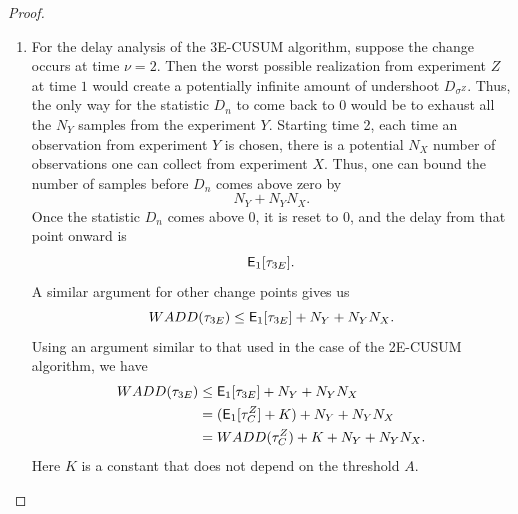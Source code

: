 \documentclass[10pt,a4paper]{amsart}
\begin{document}
\begin{proof}
\begin{enumerate}
\item For the delay analysis of the 3E-CUSUM algorithm, suppose the change occurs at time $\nu = 2$. Then the worst possible realization from experiment $Z$ at time $1$ would create a potentially infinite amount of undershoot $D_{\sigma^Z}$. Thus, the only way for the statistic $D_n$ to come back to $0$ would be to exhaust all the $N_Y$ samples from the experiment $Y$. Starting time 2, each time an observation from experiment $Y$ is chosen, there is a potential $N_X$ number of observations one can collect from experiment $X$. Thus, one can bound the number of samples before $D_n$ comes above zero by 
$$ N_Y + N_Y N_X. $$
Once the statistic $D_n$ comes above $0$, it is reset to $0$, and the delay from that point onward is 
$$ \mathsf{E}_1 [\tau_{\textup{\fontsize{6 pt}{10 pt}\selectfont 3E}}]. $$
A similar argument for other change points gives us 
$$ \textup{WADD} (\tau_{\textup{\fontsize{6 pt}{10 pt}\selectfont 3E}}) \leq \mathsf{E}_1 [\tau_{\textup{\fontsize{6 pt}{10 pt}\selectfont 3E}}] + N_Y + N_Y N_X. $$
Using an argument similar to that used in the case of the 2E-CUSUM algorithm, we have
\begin{align*}
\textup{WADD} (\tau_{\textup{\fontsize{6 pt}{10 pt}\selectfont 3E}})
& \leq \mathsf{E}_1 [\tau_{\textup{\fontsize{6 pt}{10 pt}\selectfont 3E}}] + N_Y + N_Y N_X \\
& = (\mathsf{E}_1 [\tau_{\textup{\fontsize{6 pt}{10 pt}\selectfont C}}^Z] + K) + N_Y + N_Y N_X \\
& = \textup{WADD} (\tau_{\textup{\fontsize{6 pt}{10 pt}\selectfont C}}^Z) + K + N_Y + N_Y N_X.
\end{align*}
Here $K$ is a constant that does not depend on the threshold $A$. 
\end{enumerate}
\end{proof}
\end{document}
